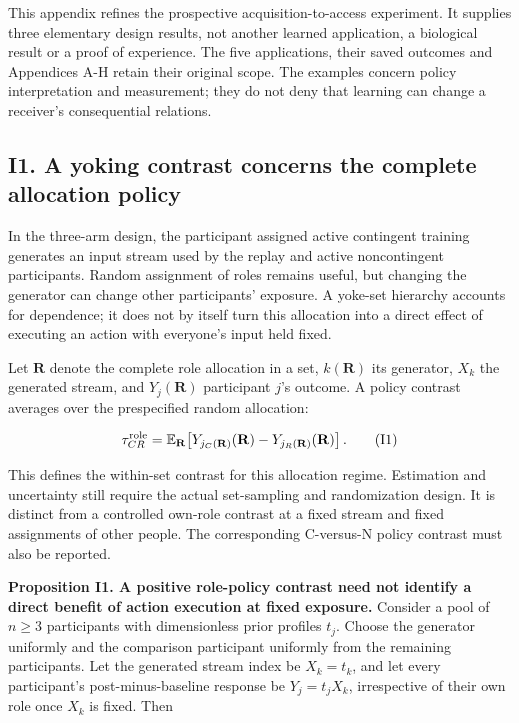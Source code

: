 \documentclass[
  american,
  11pt,
  letterpaper,
]{article}
\begin{document}
This appendix refines the prospective acquisition-to-access experiment. It supplies three elementary design results, not another learned application, a biological result or a proof of experience. The five applications, their saved outcomes and Appendices A-H retain their original scope. The examples concern policy interpretation and measurement; they do not deny that learning can change a receiver's consequential relations.

\subsection{I1. A yoking contrast concerns the complete allocation policy}\label{i1.-a-yoking-contrast-concerns-the-complete-allocation-policy}

In the three-arm design, the participant assigned active contingent training generates an input stream used by the replay and active noncontingent participants. Random assignment of roles remains useful, but changing the generator can change other participants' exposure. A yoke-set hierarchy accounts for dependence; it does not by itself turn this allocation into a direct effect of executing an action with everyone's input held fixed.

Let \(\mathbf R\) denote the complete role allocation in a set, \(k(\mathbf R)\) its generator, \(X_k\) the generated stream, and \(Y_j(\mathbf R)\) participant \(j\)'s outcome. A policy contrast averages over the prespecified random allocation:

\begin{equation}
\tau_{CR}^{\rm role}
=\mathbb E_{\mathbf R}\!\left[
Y_{j_C(\mathbf R)}(\mathbf R)-Y_{j_R(\mathbf R)}(\mathbf R)
\right].\tag{I1}
\end{equation}

This defines the within-set contrast for this allocation regime. Estimation and uncertainty still require the actual set-sampling and randomization design. It is distinct from a controlled own-role contrast at a fixed stream and fixed assignments of other people. The corresponding C-versus-N policy contrast must also be reported.

\textbf{Proposition I1. A positive role-policy contrast need not identify a direct benefit of action execution at fixed exposure.} Consider a pool of \(n\geq3\) participants with dimensionless prior profiles \(t_j\). Choose the generator uniformly and the comparison participant uniformly from the remaining participants. Let the generated stream index be \(X_k=t_k\), and let every participant's post-minus-baseline response be \(Y_j=t_jX_k\), irrespective of their own role once \(X_k\) is fixed. Then
\end{document}
